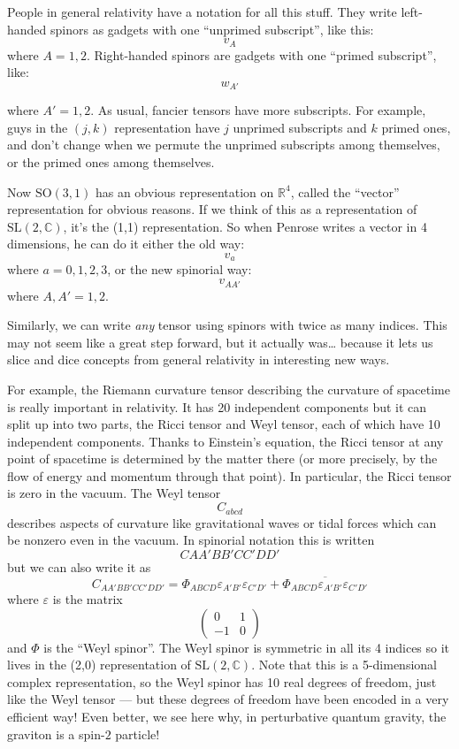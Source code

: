 \documentclass{article}
\begin{document}
People in general relativity have a notation for all this stuff. They
write left-handed spinors as gadgets with one ``unprimed subscript'',
like this: \[v_A\] where \(A = 1,2\). Right-handed spinors are gadgets
with one ``primed subscript'', like: \[w_{A'}\]

where \(A' = 1,2\). As usual, fancier tensors have more subscripts. For
example, guys in the \((j,k)\) representation have \(j\) unprimed
subscripts and \(k\) primed ones, and don't change when we permute the
unprimed subscripts among themselves, or the primed ones among
themselves.

Now \(\mathrm{SO}(3,1)\) has an obvious representation on
\(\mathbb{R}^4\), called the ``vector'' representation for obvious
reasons. If we think of this as a representation of
\(\mathrm{SL}(2,\mathbb{C})\), it's the (1,1) representation. So when
Penrose writes a vector in 4 dimensions, he can do it either the old
way: \[v_a\] where \(a = 0,1,2,3\), or the new spinorial way:
\[v_{AA'}\] where \(A,A' = 1,2\).

Similarly, we can write \emph{any} tensor using spinors with twice as
many indices. This may not seem like a great step forward, but it
actually was\ldots{} because it lets us slice and dice concepts from
general relativity in interesting new ways.

For example, the Riemann curvature tensor describing the curvature of
spacetime is really important in relativity. It has 20 independent
components but it can split up into two parts, the Ricci tensor and Weyl
tensor, each of which have 10 independent components. Thanks to
Einstein's equation, the Ricci tensor at any point of spacetime is
determined by the matter there (or more precisely, by the flow of energy
and momentum through that point). In particular, the Ricci tensor is
zero in the vacuum. The Weyl tensor \[C_{abcd}\] describes aspects of
curvature like gravitational waves or tidal forces which can be nonzero
even in the vacuum. In spinorial notation this is written
\[C{AA'BB'CC'DD'}\] but we can also write it as
\[C_{AA'BB'CC'DD'} = \Phi_{ABCD} \varepsilon_{A'B'}\varepsilon_{C'D'} + \overline{\Phi_{ABCD} \varepsilon_{A'B'}\varepsilon_{C'D'}}\]
where \(\varepsilon\) is the matrix \[
  \left(
    \begin{array}{cc}
      0&1\\-1&0
    \end{array}
  \right)
\] and \(\Phi\) is the ``Weyl spinor''. The Weyl spinor is symmetric in
all its 4 indices so it lives in the (2,0) representation of
\(\mathrm{SL}(2,\mathbb{C})\). Note that this is a 5-dimensional complex
representation, so the Weyl spinor has 10 real degrees of freedom, just
like the Weyl tensor --- but these degrees of freedom have been encoded
in a very efficient way! Even better, we see here why, in perturbative
quantum gravity, the graviton is a spin-\(2\) particle!
\end{document}
